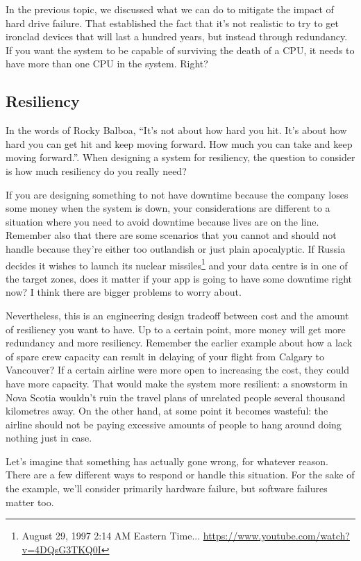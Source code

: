 In the previous topic, we discussed what we can do to mitigate the impact of hard drive failure. That established the fact that it's not realistic to try to get ironclad devices that will last a hundred years, but instead through redundancy. If you want the system to be capable of surviving the death of a CPU, it needs to have more than one CPU in the system. Right?

\subsection*{Resiliency}
In the words of Rocky Balboa, ``It's not about how hard you hit. It's about how hard you can get hit and keep moving forward. How much you can take and keep moving forward.''. When designing a system for resiliency, the question to consider is how much resiliency do you really need? 

If you are designing something to not have downtime because the company loses some money when the system is down, your considerations are different to a situation where you need to avoid downtime because lives are on the line. Remember also that there are some scenarios that you cannot and should not handle because they're either too outlandish or just plain apocalyptic. If Russia decides it wishes to launch its nuclear missiles\footnote{ August 29, 1997 2:14 AM Eastern Time... \url{https://www.youtube.com/watch?v=4DQsG3TKQ0I}} and your data centre is in one of the target zones, does it matter if your app is going to have some downtime right now? I think there are bigger problems to worry about.

Nevertheless, this is an engineering design tradeoff between cost and the amount of resiliency you want to have. Up to a certain point, more money will get more redundancy and more resiliency. Remember the earlier example about how a lack of spare crew capacity can result in delaying of your flight from Calgary to Vancouver? If a certain airline were more open to increasing the cost, they could have more capacity. That would make the system more resilient: a snowstorm in Nova Scotia wouldn't ruin the travel plans of unrelated people several thousand kilometres away. On the other hand, at some point it becomes wasteful: the airline should not be paying excessive amounts of people to hang around doing nothing just in case.

Let's imagine that something has actually gone wrong, for whatever reason. There are a few different ways to respond or handle this situation. For the sake of the example, we'll consider primarily hardware failure, but software failures matter too.

